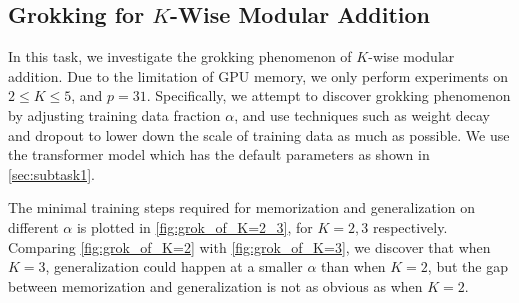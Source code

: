 \subsection{Grokking for $K$-Wise Modular Addition}
\label{sec:subtask4}
In this task, we investigate the grokking phenomenon of $K$-wise modular addition. Due to the limitation of GPU memory, we only perform experiments on $2\leq K\leq 5$, and $p=31$. Specifically, we attempt to discover grokking phenomenon by adjusting training data fraction $\alpha$, and use techniques such as weight decay and dropout to lower down the scale of training data as much as possible. We use the transformer model which has the default parameters as shown in \cref{sec:subtask1}.

The minimal training steps required for memorization and generalization on different $\alpha$ is plotted in \cref{fig:grok_of_K=2_3}, for $K = 2, 3$ respectively. 
Comparing \cref{fig:grok_of_K=2} with \cref{fig:grok_of_K=3}, we discover that when $K=3$, generalization could happen at a smaller $\alpha$ than when $K=2$, but the gap between memorization and generalization is not as obvious as when $K=2$.    
